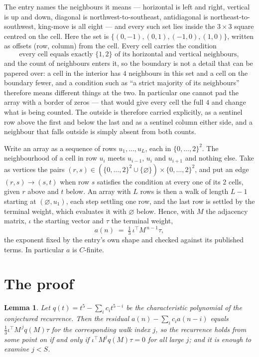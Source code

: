 \documentclass[11pt,a4paper]{article}
\theoremstyle{plain}
\newtheorem{lemma}[theorem]{Lemma}
\theoremstyle{definition}
\begin{document}
The entry names the neighbours it means --- horizontal is left and right, vertical is up and
down, diagonal is northwest-to-southeast, antidiagonal is northeast-to-southwest, king-move is
all eight --- and every such set lies inside the $3\times3$ square centred on the cell. Here
the set is $\{(0,-1), (0,1), (-1,0), (1,0)\}$, written as offsets (row, column) from the cell. Every cell carries
the condition
\[
\text{every cell equals exactly }\{1,2\}\text{ of its horizontal and vertical neighbours},
\]
and the count of neighbours enters it, so the boundary is not a detail that can be papered
over: a cell in the interior has $4$ neighbours in this set and a cell on the boundary
fewer, and a condition such as ``a strict majority of its neighbours'' therefore means
different things at the two. In particular one cannot pad the array with a border of zeros ---
that would give every cell the full $4$ and change what is being counted. The outside is
therefore carried
explicitly, as a sentinel row above the first and below the last and as a sentinel column
either side, and a neighbour that falls outside is simply absent from both counts.

Write an array as a sequence of rows $u_1,\dots,u_L$, each in
$\{0,\dots,2\}^{2}$. The neighbourhood of a cell in row $u_i$ meets $u_{i-1}$,
$u_i$ and $u_{i+1}$ and nothing else. Take as vertices the pairs
$(r,s)\in(\{0,\dots,2\}^{2}\cup\{\varnothing\})\times\{0,\dots,2\}^{2}$,
and put an edge $(r,s)\to(s,t)$ when row $s$ satisfies the condition at every one of its
$2$ cells, given $r$ above and $t$ below. An array with $L$ rows is then a walk of length
$L-1$ starting at $(\varnothing,u_1)$, each step settling one row, and the last row is
settled by the terminal weight, which evaluates it with $\varnothing$ below. Hence,
with $M$ the adjacency matrix, $\iota$ the starting vector and $\tau$ the terminal weight,
\[
a(n)\;=\;\tfrac1{3}\,\iota^{\!\top}M^{\,n-1}\tau ,
\]
the exponent fixed by the entry's own shape and checked against its published terms. In
particular $a$ is $C$-finite.

\section{The proof}

\begin{lemma}\label{lem:crit}
Let $q(t)=t^{5}-\sum_i c_it^{5-i}$ be the characteristic polynomial of the
conjectured recurrence. Then the residual $a(n)-\sum_ic_ia(n-i)$ equals
$\tfrac1{3}\iota^{\!\top}M^{\,j}q(M)\tau$ for the corresponding walk index $j$, so the
recurrence holds from some point on if and only if $\iota^{\!\top}M^{j}q(M)\tau=0$ for all
large $j$; and it is enough to examine $j<S$.
\end{lemma}
\end{document}
